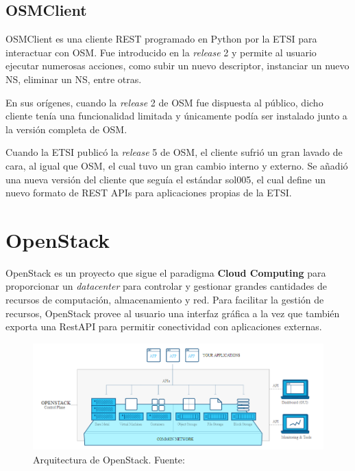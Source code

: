 \subsection{OSMClient}
\label{subsec:osmclientpython}

OSMClient\cite{osmclientbib} es una cliente REST programado en Python por la ETSI para interactuar con OSM. Fue introducido en la \textit{release} 2 y permite al usuario ejecutar numerosas acciones, como subir un nuevo descriptor, instanciar un nuevo NS, eliminar un NS, entre otras.

En sus orígenes, cuando la \textit{release} 2 de OSM fue dispuesta al público, dicho cliente tenía una funcionalidad limitada y únicamente podía ser instalado junto a la versión completa de OSM.

Cuando la ETSI publicó la \textit{release} 5 de OSM, el cliente sufrió un gran lavado de cara, al igual que OSM, el cual tuvo un gran cambio interno y externo. Se añadió una nueva versión del cliente que seguía el estándar sol005\cite{sol005item}, el cual define un nuevo formato de REST APIs para aplicaciones propias de la ETSI.


\section{OpenStack}
\label{sec:openstack}

OpenStack\cite{openstackbib} es un proyecto que sigue el paradigma \textbf{Cloud Computing} para proporcionar un \textit{datacenter} para controlar y gestionar grandes cantidades de recursos de computación, almacenamiento y red. Para facilitar la gestión de recursos, OpenStack provee al usuario una interfaz gráfica a la vez que también exporta una RestAPI para permitir conectividad con aplicaciones externas.

\begin{figure}[!ht]
	\centering
	\includegraphics[width=0.9\linewidth]{imagenes/openstack_arch}
	\caption{Arquitectura de OpenStack. Fuente:\cite{openstackbib}}
	\label{fig:openstackarch}
\end{figure}

